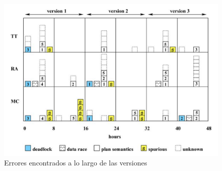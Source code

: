 \documentclass[runningheads]{llncs}
\begin{document}
\begin{figure}[H]
\includegraphics[width=\textwidth]{fig3.png}
\caption{Errores encontrados a lo largo de las versiones} \label{fig3}
\end{figure}
\end{document}
